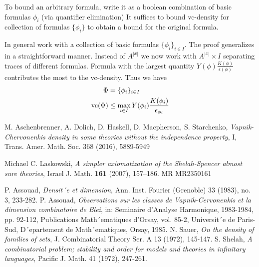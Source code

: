 \documentclass{amsart}
\begin{document}
To bound an arbitrary formula, write it as a boolean combination of basic formulas $\phi_i$ (via quantifier elimination)
It suffices to bound vc-density for collection of formulas $\{\phi_i\}$ to obtain a bound for the original formula.

In general work with a collection of basic formulas $\{\phi_i\}_{i \in I}$.
The proof generalizes in a straightforward manner.
Instead of $A^{|x|}$ we now work with $A^{|x|} \times I$ separating traces of different formulas.
Formula with the largest quantity $Y(\phi)\frac{K(\phi)}{\epsilon(\phi)}$ contributes the most to the vc-density.
Thus we have
\begin{align*}
  \Phi &= \{\phi_i\}_{i \in I} \\
  \operatorname{vc}(\Phi) &\leq   \max_{i \in I} Y(\phi_i) \frac{K(\phi_i)}{\epsilon_{\phi_i}}
\end{align*}


\begin{thebibliography}{9}

  M. Aschenbrenner, A. Dolich, D. Haskell, D. Macpherson, S. Starchenko,
  \textit{Vapnik-Chervonenkis density in some theories without the independence property}, I,
  Trans. Amer. Math. Soc. 368 (2016), 5889-5949
  
  Michael C. Laskowski, \textit{A simpler axiomatization of the Shelah-Spencer almost sure theories},
  Israel J. Math. \textbf{161} (2007), 157–186. MR MR2350161	

  P. Assouad, \textit{Densit´e et dimension}, Ann. Inst. Fourier (Grenoble) 33 (1983), no. 3, 233-282.
  P. Assouad, \textit{Observations sur les classes de Vapnik-Cervonenkis et la dimension combinatoire de Blei},
  in: Seminaire d’Analyse Harmonique, 1983-1984, pp. 92-112, Publications Math´ematiques
  d’Orsay, vol. 85-2, Universit´e de Paris-Sud, D´epartement de Math´ematiques, Orsay, 1985.
  N. Sauer, \textit{On the density of families of sets}, J. Combinatorial Theory Ser. A 13 (1972), 145-147.
  S. Shelah, \textit{A combinatorial problem; stability and order for models and theories in infinitary languages},
  Pacific J. Math. 41 (1972), 247-261.

\end{thebibliography}
\end{document}
